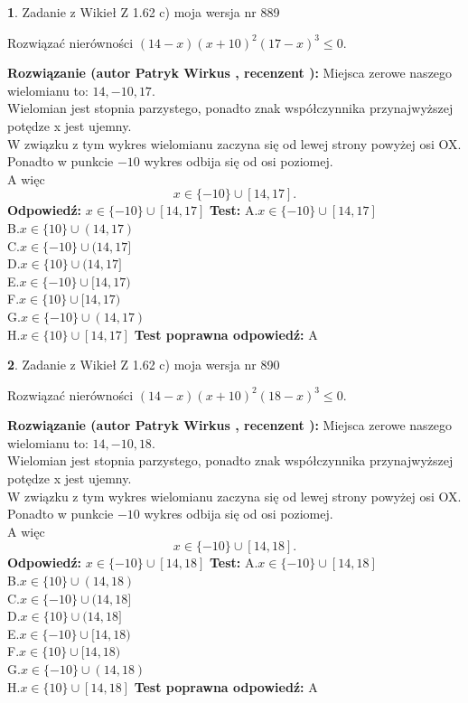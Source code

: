 \documentclass[12pt, a4paper]{article}
\theoremstyle{definition} %
\newtheorem{zad}{}
\newcommand{\zadStart}[1]{\begin{zad}#1\newline}
\newcommand{\zadStop}{\end{zad}}
\newcommand{\rozwStart}[2]{\noindent \textbf{Rozwiązanie (autor #1 , recenzent #2): }\newline}
\newcommand{\rozwStop}{\newline}
\newcommand{\odpStart}{\noindent \textbf{Odpowiedź:}\newline}
\newcommand{\odpStop}{\newline}
\newcommand{\testStart}{\noindent \textbf{Test:}\newline}
\newcommand{\testStop}{\newline}
\newcommand{\kluczStart}{\noindent \textbf{Test poprawna odpowiedź:}\newline}
\newcommand{\kluczStop}{\newline}
\begin{document}
\zadStart{Zadanie z Wikieł Z 1.62 c) moja wersja nr 889}

Rozwiązać nierówności $(14-x)(x+10)^{2}(17-x)^{3}\le0$.
\zadStop
\rozwStart{Patryk Wirkus}{}
Miejsca zerowe naszego wielomianu to: $14, -10, 17$.\\
Wielomian jest stopnia parzystego, ponadto znak współczynnika przy\linebreak najwyższej potędze x jest ujemny.\\ W związku z tym wykres wielomianu zaczyna się od lewej strony powyżej osi OX.\\
Ponadto w punkcie $-10$ wykres odbija się od osi poziomej.\\
A więc $$x \in \{-10\} \cup [14,17].$$
\rozwStop
\odpStart
$x \in \{-10\} \cup [14,17]$
\odpStop
\testStart
A.$x \in \{-10\} \cup [14,17]$\\
B.$x \in \{10\} \cup (14,17)$\\
C.$x \in \{-10\} \cup (14,17]$\\
D.$x \in \{10\} \cup (14,17]$\\
E.$x \in \{-10\} \cup [14,17)$\\
F.$x \in \{10\} \cup [14,17)$\\
G.$x \in \{-10\} \cup (14,17)$\\
H.$x \in \{10\} \cup [14,17]$
\testStop
\kluczStart
A
\kluczStop



\zadStart{Zadanie z Wikieł Z 1.62 c) moja wersja nr 890}

Rozwiązać nierówności $(14-x)(x+10)^{2}(18-x)^{3}\le0$.
\zadStop
\rozwStart{Patryk Wirkus}{}
Miejsca zerowe naszego wielomianu to: $14, -10, 18$.\\
Wielomian jest stopnia parzystego, ponadto znak współczynnika przy\linebreak najwyższej potędze x jest ujemny.\\ W związku z tym wykres wielomianu zaczyna się od lewej strony powyżej osi OX.\\
Ponadto w punkcie $-10$ wykres odbija się od osi poziomej.\\
A więc $$x \in \{-10\} \cup [14,18].$$
\rozwStop
\odpStart
$x \in \{-10\} \cup [14,18]$
\odpStop
\testStart
A.$x \in \{-10\} \cup [14,18]$\\
B.$x \in \{10\} \cup (14,18)$\\
C.$x \in \{-10\} \cup (14,18]$\\
D.$x \in \{10\} \cup (14,18]$\\
E.$x \in \{-10\} \cup [14,18)$\\
F.$x \in \{10\} \cup [14,18)$\\
G.$x \in \{-10\} \cup (14,18)$\\
H.$x \in \{10\} \cup [14,18]$
\testStop
\kluczStart
A
\kluczStop
\end{document}
